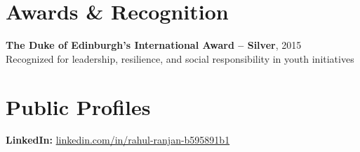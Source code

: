 \documentclass[a4paper,10pt]{article}
\begin{document}
\section*{Awards \& Recognition}
\textbf{The Duke of Edinburgh's International Award – Silver}, 2015 \\
Recognized for leadership, resilience, and social responsibility in youth initiatives

\section*{Public Profiles}
\textbf{LinkedIn:} \href{https://www.linkedin.com/in/rahul-ranjan-b595891b1}{linkedin.com/in/rahul-ranjan-b595891b1}
\end{document}
